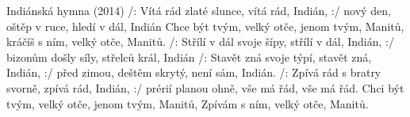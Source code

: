 \begin{TEXT}{Indiánská hymna (2014)} %
\SLOKA /: Vítá rád zlaté slunce, vítá rád, Indián, :/
nový den, oštěp v ruce, hledí v dál, Indián
\REFREN Chce být tvým, velký otče, jenom tvým, Manitů,
kráčíš s ním, velký otče, Manitů.
\SLOKA /: Střílí v dál svoje šípy, střílí v dál, Indián, :/
bizonům došly síly, střelců král, Indián
\REFRENHRAJ
\SLOKA /: Stavět zná svoje týpí, stavět zná, Indián, :/
před zimou, deštěm skrytý, není sám, Indián.
\REFRENHRAJ
\SLOKA /: Zpívá rád s bratry svorně, zpívá rád, Indián, :/
prérií planou ohně, vše má řád, vše má řád.
\REFREN Chci být tvým, velký otče, jenom tvým, Manitů,
Zpívám s ním, velký otče, Manitů.
\end{TEXT}